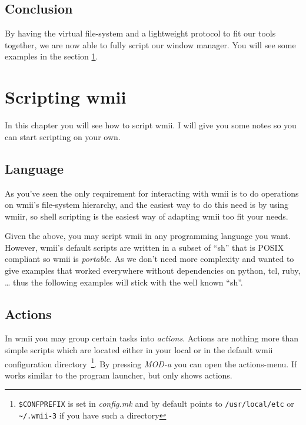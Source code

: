 \documentclass[12pt,a4paper]{article} %
\begin{document}
  \subsection{Conclusion}

    By having the virtual file-system and a lightweight protocol to
    fit our tools together, we are now able to fully script our window
    manager. You will see some examples in the section
    \ref{sec:scripting}.

\section{Scripting wmii}
\label{sec:scripting}

  In this chapter you will see how to script wmii. I will give you
  some notes so you can start scripting on your own.

  \subsection{Language}

    As you've seen the only requirement for interacting with wmii is
    to do operations on wmii's file-system hierarchy, and the easiest
    way to do this need is by using wmiir, so shell scripting is the
    easiest way of adapting wmii too fit your needs.

    Given the above, you may script wmii in any programming language
    you want. However, wmii's default scripts are written in a subset
    of ``sh'' that is POSIX compliant so wmii is \emph{portable}.  As
    we don't need more complexity and wanted to give examples that
    worked everywhere without dependencies on python, tcl, ruby, \dots
    thus the following examples will stick with the well known ``sh''.


  \subsection{Actions}

    In wmii you may group certain tasks into \emph{actions}. Actions
    are nothing more than simple scripts which are located either in
    your local or in the default wmii configuration
    directory~\footnote{ \texttt{\$CONFPREFIX} is set in
    \emph{config.mk} and by default points to \texttt{/usr/local/etc}
    or \texttt{\~{}/.wmii-3} if you have such a directory}.
    By pressing \emph{MOD-a} you can open the actions-menu. If works
    similar to the program launcher, but only shows actions.
\end{document}
